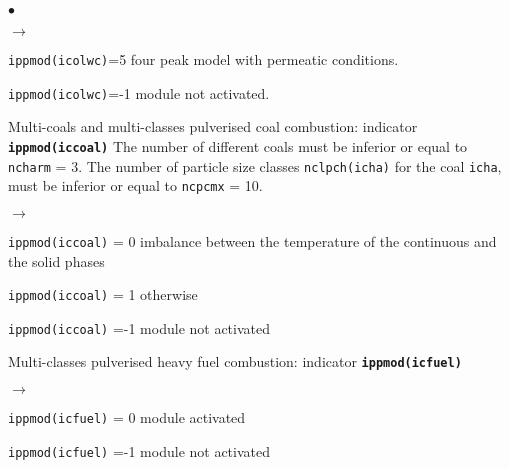 {{\begin{list}{$\bullet$}{}
\begin{list}{$\rightarrow$}{}
               \item \texttt{ippmod(icolwc)}=5 four peak model with permeatic conditions.
               \item \texttt{ippmod(icolwc)}=-1 module not activated.
          \end{list}
        \item Multi-coals and multi-classes pulverised coal combustion:
              indicator {\bf \tt ippmod(iccoal)}
              The number of different coals must be inferior or equal to
              \texttt{ncharm} = 3. The number of particle size
             classes \texttt{nclpch(icha)} for the coal
             \texttt{icha}, must
             be inferior or equal to \texttt{ncpcmx} = 10.
         \begin{list}{$\rightarrow$}{}
                \item \texttt{ippmod(iccoal)} = 0 imbalance between the
                      temperature of the continuous and the solid phases
                \item \texttt{ippmod(iccoal)} = 1 otherwise
                \item \texttt{ippmod(iccoal)} =-1 module not activated
         \end{list}

        \item Multi-classes pulverised heavy fuel combustion:
              indicator {\bf \tt ippmod(icfuel)}
         \begin{list}{$\rightarrow$}{}
                \item \texttt{ippmod(icfuel)} = 0 module activated
                \item \texttt{ippmod(icfuel)} =-1 module not activated
         \end{list}


\end{list}}}
